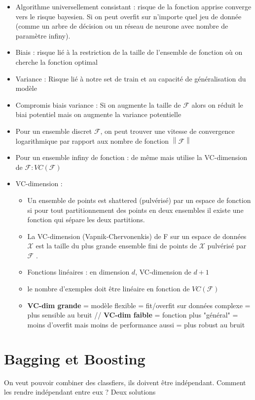 \documentclass{article}
\theoremstyle{plain}%
\theoremstyle{definition}
\theoremstyle{remark}
\begin{document}
\begin{itemize}
    \item Algorithme universellement consistant : risque de la fonction apprise converge vers le risque bayesien. Si on peut overfit sur n'importe quel jeu de donnée (comme un arbre de décision ou un réseau de neurone avec nombre de paramètre infiny).
    \item Biais : risque lié à la restriction de la taille de l'ensemble de fonction où on cherche la fonction optimal
    \item Variance : Risque lié à notre set de train et au capacité de généralisation du modèle
    \item Compromis biais variance : Si on augmente la taille de $\mathcal{F}$ alors on réduit le biai potentiel mais on augmente la variance potentielle
    \item Pour un ensemble discret $ \mathcal{F} $, on peut trouver une vitesse de convergence logarithmique par rapport aux nombre de fonction $ \left\| \mathcal{F} \right\|  $ 
    \item Pour un ensemble infiny de fonction : de même mais utilise la VC-dimension de $ \mathcal{F} : VC(\mathcal{F}) $ 
    \item VC-dimension : \begin{itemize}
        \item Un ensemble de points est shattered (pulvérisé) par un espace de fonction si pour tout partitionnement des points en deux ensembles il existe une fonction qui sépare les deux partitions.
        \item La VC-dimension (Vapnik-Chervonenkis) de F sur un espace de données $ \mathcal{X} $  est la taille du plus grande ensemble fini de points de $ \mathcal{X} $  pulvérisé par $ \mathcal{F} $ .
        \item Fonctions linéaires : en dimension $ d $, VC-dimension de $ d + 1 $
        \item le nombre d'exemples doit être linéaire en fonction de $ VC(\mathcal{F}) $ 
        \item \textbf{VC-dim grande} = modèle flexible = fit/overfit sur données complexe = plus sensible au bruit // \textbf{VC-dim faible} = fonction plus "général" = moins d'overfit mais moins de performance aussi = plus robust au bruit 
    \end{itemize}
\end{itemize}

\section{Bagging et Boosting}
On veut pouvoir combiner des classfiers, ils doivent être indépendant. Comment les rendre indépendant entre eux ? Deux solutions
\end{document}
